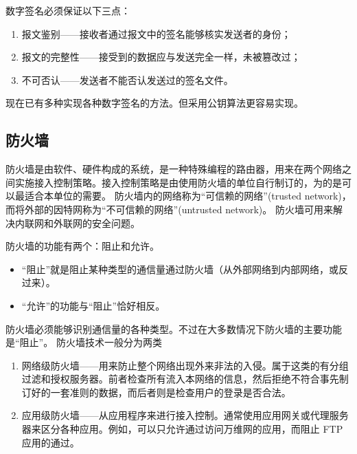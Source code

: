数字签名必须保证以下三点：

\begin{enumerate}
  \item 报文鉴别——接收者通过报文中的签名能够核实发送者的身份；
  \item 报文的完整性——接受到的数据应与发送完全一样，未被篡改过；
  \item 不可否认——发送者不能否认发送过的签名文件。
\end{enumerate}

现在已有多种实现各种数字签名的方法。但采用公钥算法更容易实现。


\subsection{防火墙}

防火墙是由软件、硬件构成的系统，是一种特殊编程的路由器，用来在两个网络之间实施接入控制策略。接入控制策略是由使用防火墙的单位自行制订的，为的是可以最适合本单位的需要。
防火墙内的网络称为“可信赖的网络”(trusted network)，而将外部的因特网称为“不可信赖的网络”(untrusted network)。
防火墙可用来解决内联网和外联网的安全问题。


防火墙的功能有两个：阻止和允许。

\begin{itemize}
  \item “阻止”就是阻止某种类型的通信量通过防火墙（从外部网络到内部网络，或反过来）。

  \item “允许”的功能与“阻止”恰好相反。

\end{itemize}




防火墙必须能够识别通信量的各种类型。不过在大多数情况下防火墙的主要功能是“阻止”。
防火墙技术一般分为两类


\begin{enumerate}
  \item 网络级防火墙——用来防止整个网络出现外来非法的入侵。属于这类的有分组过滤和授权服务器。前者检查所有流入本网络的信息，然后拒绝不符合事先制订好的一套准则的数据，而后者则是检查用户的登录是否合法。

  \item 应用级防火墙——从应用程序来进行接入控制。通常使用应用网关或代理服务器来区分各种应用。例如，可以只允许通过访问万维网的应用，而阻止 FTP 应用的通过。

\end{enumerate}

